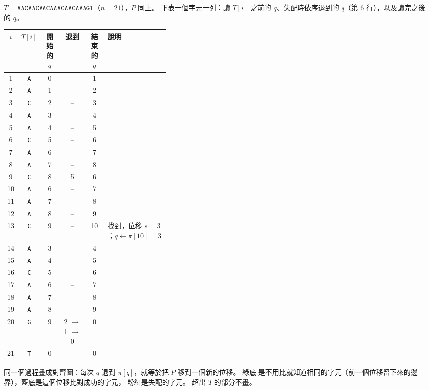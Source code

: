 $T = \mathtt{AACAACAACAAACAACAAAGT}$（$n = 21$），$P$ 同上。 下表一個字元一列：讀
$T[i]$ 之前的 $q$、失配時依序退到的 $q$（第 6 行），以及讀完之後的 $q$。

\begin{center}
\small
\begin{tabular}{ccccc>{\raggedright\arraybackslash}p{0.38\linewidth}}
\toprule
$i$ & $T[i]$ & 開始的 $q$ & 退到 & 結束的 $q$ & 說明 \\
\midrule
1 & \texttt{A} & 0 & -- & 1 &  \\
2 & \texttt{A} & 1 & -- & 2 &  \\
3 & \texttt{C} & 2 & -- & 3 &  \\
4 & \texttt{A} & 3 & -- & 4 &  \\
5 & \texttt{A} & 4 & -- & 5 &  \\
6 & \texttt{C} & 5 & -- & 6 &  \\
7 & \texttt{A} & 6 & -- & 7 &  \\
8 & \texttt{A} & 7 & -- & 8 &  \\
9 & \texttt{C} & 8 & 5 & 6 &  \\
10 & \texttt{A} & 6 & -- & 7 &  \\
11 & \texttt{A} & 7 & -- & 8 &  \\
12 & \texttt{A} & 8 & -- & 9 &  \\
13 & \texttt{C} & 9 & -- & 10 & 找到，位移 $s=3$；$q\gets\pi[10]=3$ \\
14 & \texttt{A} & 3 & -- & 4 &  \\
15 & \texttt{A} & 4 & -- & 5 &  \\
16 & \texttt{C} & 5 & -- & 6 &  \\
17 & \texttt{A} & 6 & -- & 7 &  \\
18 & \texttt{A} & 7 & -- & 8 &  \\
19 & \texttt{A} & 8 & -- & 9 &  \\
20 & \texttt{G} & 9 & 2 $\to$ 1 $\to$ 0 & 0 &  \\
21 & \texttt{T} & 0 & -- & 0 &  \\
\bottomrule
\end{tabular}
\end{center}

同一個過程畫成對齊圖：每次 $q$ 退到 $\pi[q]$，就等於把 $P$ 移到一個新的位移。 綠底
是不用比就知道相同的字元（前一個位移留下來的邊界），藍底是這個位移比對成功的字元，
粉紅是失配的字元。 超出 $T$ 的部分不畫。


